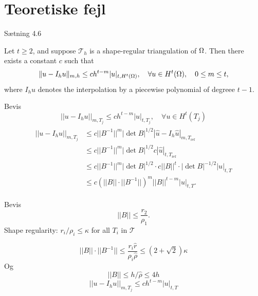 \section{Teoretiske fejl}
\begin{frame}{Sætning 4.6}{}
    \begin{theorem}
    Let $t \geq 2$, and suppose $\mathcal{T}_h$ is a shape-regular triangulation of $\Omega$. Then there exists a constant $c$ such that
    \begin{equation}
        \|u - I_h u\| _{m,h} \leq c h^{t-m} |u|_{t, H^t(\Omega)}, \quad \forall u \in H^t(\Omega), \quad 0 \leq m \leq t,
    \end{equation}
    where $I_h u$ denotes the interpolation by a piecewise polynomial of degreee $t-1$.
    \end{theorem}
\end{frame}
\begin{frame}{Bevis}
    \begin{equation}
        ||u-I_h u||_{m,T_j} \leq c h^{t-m} |u|_{t,T_j}, \quad \forall u \in H^t(T_j)
    \end{equation}
    \begin{align}
        \begin{split}
        ||u-I_h u||_{m,T_j} &\leq c ||B^{-1}||^m |\det B |^{1/2} |\hat{u} - I_h \hat{u}|_{m,T_{\text{ref}}} \\
                            &\leq c ||B^{-1}||^m |\det B |^{1/2} c | \hat{u} |_{t,T_{\text{ref}}} \\
                            &\leq c ||B^{-1}||^m |\det B |^{1/2} \cdot c ||B||^t \cdot |\det B |^{-1/2} |u|_{t,T}  \\
                         &\leq c {\left( ||B||  \cdot ||B^{-1}|| \right)}^m ||B||^{t-m} |u|_{t,T}.
        \end{split}
    \end{align}
\end{frame}
\begin{frame}{Bevis}
\begin{equation}
    ||B|| \leq \frac{r_2}{\rho_1}.
\end{equation}
    Shape regularity: $r_i / \rho_i \leq \kappa$ for all $T_i$ in $\mathcal{T}$

    $$||B|| \cdot ||B^{-1}|| \leq \frac{r_i \hat{r}}{\rho_i \hat{\rho}} \leq \left( 2 + \sqrt{2} \right)\kappa$$
    Og
    $$||B|| \leq h/\hat{\rho}\leq 4h$$
    \begin{equation}
        ||u-I_h u||_{m,T_j} \leq c h^{t-m} |u|_{t,T}
    \end{equation}
\end{frame}

